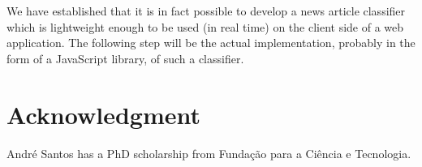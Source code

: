 \documentclass[conference]{IEEEtran}
\begin{document}
We have established that it is in fact possible
to develop a news article classifier which is lightweight enough to be
used (in real time) on the client side of a web application. The
following step will be the actual implementation, probably in the form
of a JavaScript library, of such a classifier.


\section*{Acknowledgment}

André Santos has a PhD scholarship from Fundação para a Ciência e
Tecnologia.



\end{document}
